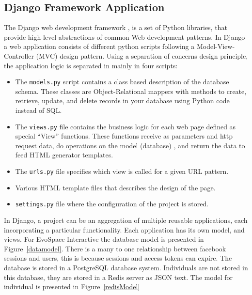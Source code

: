 \documentclass{sig-alternate}
\begin{document}
\subsection{Django Framework Application}
The Django web development framework \cite{django}, is a set of Python libraries, that provide high-level abstractions of common Web development patterns. In Django a web application consists of different python scripts following a Model-View-Controller (MVC) design pattern. Using a separation of concerns design principle, the application logic is separated in mainly in four scripts:
\begin{itemize}
	\item The \texttt{models.py} script contains a class based description of the database schema. These classes are Object-Relational mappers with methods to create, retrieve, update, and delete records in your database using Python code instead of SQL.
	\item The \texttt{views.py} file contains the business logic for each web page defined as special  ``View'' functions. These functions receive as parameters and http request data, do operations on the model (database) , and return the data to feed HTML generator templates. 
	\item The \texttt{urls.py} file specifies which view is called for a given URL pattern.
    \item Various HTML template files that describes the design of the page.
    \item \texttt{settings.py} file where the configuration of the project is stored.
\end{itemize}

In Django, a project can be an aggregation of multiple reusable applications, each incorporating a particular functionality. Each application has its own model, and views. For EvoSpace-Interactive the database model is presented in Figure~\ref{datamodel}. There is a many to one relationship between facebook sessions and users, this is because sessions and access tokens can expire. The database is stored in a PostgreSQL database system. Individuals are not stored in this database, they are stored in a Redis server as JSON text. The model for individual is presented in Figure~\ref{redisModel}   
\end{document}
